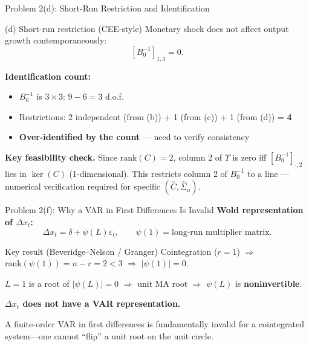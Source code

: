 \documentclass[aspectratio=169,11pt]{beamer}
\newcommand{\rank}{\mathrm{rank}}
\begin{document}
\begin{frame}{Problem 2(d): Short-Run Restriction and Identification}
    \begin{alertblock}{(d) Short-run restriction (CEE-style)}
        Monetary shock does not affect output growth contemporaneously:
        \[
        [B_0^{-1}]_{1,3} = 0.
        \]
    \end{alertblock}

    \vspace{0.3em}
    \textbf{Identification count:}
    \begin{itemize}
        \item $B_0^{-1}$ is $3\times 3$: $9 - 6 = 3$ d.o.f.
        \item Restrictions: 2 independent (from (b)) + 1 (from (c)) + 1 (from (d)) = \textbf{4}
        \item \textbf{Over-identified by the count} --- need to verify consistency
    \end{itemize}

    \vspace{0.3em}
    \textbf{Key feasibility check.} Since $\rank(C)=2$, column 2 of $\Upsilon$ is zero iff $[B_0^{-1}]_{\cdot,2}$ lies in $\ker(C)$ (1-dimensional). This restricts column 2 of $B_0^{-1}$ to a line --- numerical verification required for specific $(\hat{C},\hat\Sigma_u)$.
\end{frame}

\begin{frame}{Problem 2(f): Why a VAR in First Differences Is Invalid}
    \textbf{Wold representation of $\Delta x_t$:}
    \[
    \Delta x_t = \delta + \psi(L)\varepsilon_t, \qquad \psi(1) = \text{long-run multiplier matrix.}
    \]

    \begin{alertblock}{Key result (Beveridge--Nelson / Granger)}
        Cointegration ($r=1$) $\Rightarrow$ $\rank(\psi(1)) = n - r = 2 < 3$ $\Rightarrow$ $|\psi(1)|=0$.

        \medskip
        $L=1$ is a root of $|\psi(L)|=0$ $\Rightarrow$ unit MA root $\Rightarrow$ $\psi(L)$ is \textbf{noninvertible}.

        \medskip
        \textbf{$\Delta x_t$ does not have a VAR representation.}
    \end{alertblock}

    \vspace{0.3em}
    \textcolor{mitred}{A finite-order VAR in first differences is fundamentally invalid for a cointegrated system---one cannot ``flip'' a unit root on the unit circle.}
\end{frame}
\end{document}
